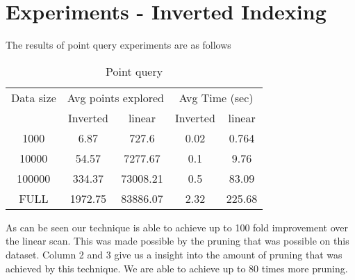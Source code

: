 \section{Experiments - Inverted Indexing}
The results of point query experiments are as follows\\

\begin{table}[ht!]
\centering
\caption{Point query}
\begin{tabular}{|c|c|c|c|c|}
\hline 
Data size & \multicolumn{2}{c|}{Avg points explored} & \multicolumn{2}{c|}{Avg Time (sec)}\\ 
 & Inverted & linear & Inverted & linear \\ 
\hline 
1000 & 6.87 & 727.6 & 0.02 & 0.764 \\ 
10000 & 54.57 & 7277.67 & 0.1 & 9.76 \\ 
100000 & 334.37 & 73008.21 & 0.5 & 83.09 \\ 
FULL & 1972.75 & 83886.07 & 2.32 & 225.68 \\ 
\hline 
\end{tabular} 
\end{table}

As can be seen our technique is able to achieve up to 100 fold improvement over the linear scan. This was made possible by the pruning that was possible on this dataset. Column 2 and 3 give us a insight into the amount of pruning that was achieved by this technique. We are able to achieve up to 80 times more pruning.
